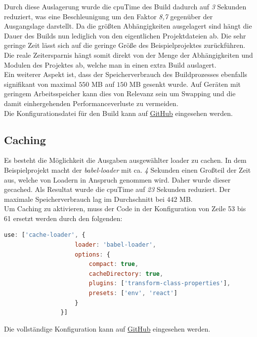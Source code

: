 \documentclass[11pt]{report}
\begin{document}
        		Durch diese Auslagerung wurde die \Gls{cpuTime} des Build dadurch auf \emph{3} Sekunden reduziert, was eine Beschleunigung um den Faktor \emph{8,7} gegenüber der Ausgangslage darstellt. Da die größten Abhängigkeiten ausgelagert sind hängt die Dauer des Builds nun lediglich von den eigentlichen Projektdateien ab. Die sehr geringe Zeit lässt sich auf die geringe Größe des Beispielprojektes zurückführen. Die reale Zeitersparnis hängt somit direkt von der Menge der Abhängigkeiten und Modulen des Projektes ab, welche man in einen extra Build auslagert.\\
        		Ein weiterer Aspekt ist, dass der Speicherverbrauch des Buildprozesses ebenfalls signifikant von maximal $550$ MB auf $150$ MB gesenkt wurde. Auf Geräten mit geringem Arbeitsspeicher kann dies von Relevanz sein um Swapping und die damit einhergehenden Performanceverluste zu vermeiden.\\
        		Die Konfigurationsdatei für den Build kann auf \href{https://github.com/TexNAK/WebBundlerOptimization/compare/master...nondestr_scopedCompilation#diff-1fb5683b1e7adbcee273b7f9f9a08a22}{GitHub} eingesehen werden.


    		\subsection{Caching}
    			Es besteht die Möglichkeit die Ausgaben ausgewählter \Gls{loader} zu cachen. In dem Beispielprojekt macht der \emph{babel-loader} mit ca. \emph{4} Sekunden einen Großteil der Zeit aus, welche von Loadern in Anspruch genommen wird. Daher wurde dieser gecached. Als Resultat wurde die \Gls{cpuTime} auf \emph{23} Sekunden reduziert. Der maximale Speicherverbrauch lag im Durchschnitt bei $442$ MB.\\
    			Um Caching zu aktivieren, muss der Code in der Konfiguration von Zeile 53 bis 61 ersetzt werden durch den folgenden:
    			\begin{center}
		        	\lstset{%
					    caption=Caching,
						basicstyle=\footnotesize,
						xleftmargin=.15\textwidth,
						xrightmargin=.15\textwidth,
						numbers=none
					}
		        	\begin{lstlisting}[language=JavaScript]
				use: ['cache-loader', {
				    loader: 'babel-loader',
				    options: {
				        compact: true,
				        cacheDirectory: true,
				        plugins: ['transform-class-properties'],
				        presets: ['env', 'react']
				    }
				}]
		        	\end{lstlisting}
	        	\end{center}
    			Die vollständige Konfiguration kann auf \href{https://github.com/TexNAK/WebBundlerOptimization/commit/370e3233461f32c823e6c794ad52179e15391ebc#diff-1fb5683b1e7adbcee273b7f9f9a08a22}{GitHub} eingesehen werden.
    			
\end{document}
